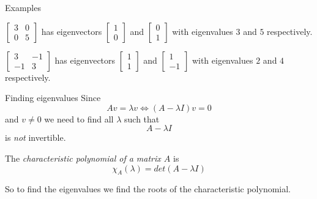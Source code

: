 \documentclass{beamer}
\begin{document}
\begin{frame}{Examples}
\begin{example}
$\left[
\begin{matrix}
3&0\\
0&5
\end{matrix}
\right]$ has eigenvectors $\left[
\begin{matrix}
1\\
0
\end{matrix}
\right]$ and $\left[
\begin{matrix}
0\\
1
\end{matrix}
\right]$ with eigenvalues $3$ and $5$ respectively.
\end{example}
\begin{example}
$\left[
\begin{matrix}
3&-1\\
-1&3
\end{matrix}
\right]$ has eigenvectors $\left[
\begin{matrix}
1\\
1
\end{matrix}
\right]$ and $\left[
\begin{matrix}
1\\
-1
\end{matrix}
\right]$ with eigenvalues $2$ and $4$ respectively.
\end{example}
\end{frame}

\begin{frame}{Finding eigenvalues}
Since
\begin{equation*}
Av = \lambda v \iff (A-\lambda I)v = 0
\end{equation*}
and $v\neq 0$ we need to find all $\lambda$ such that 
\begin{equation*}
	A-\lambda I
\end{equation*}
is \emph{not} invertible.\vfill
\begin{definition}
	The \emph{characteristic polynomial of a matrix $A$} is
	\begin{equation*}
	 	\chi_A(\lambda) = det(A-\lambda I)
	 \end{equation*} 
\end{definition}
So to find the eigenvalues we find the roots of the characteristic polynomial.
\end{frame}
\end{document}
